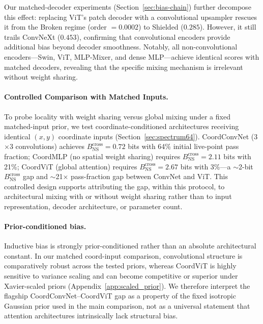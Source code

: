 \documentclass{article}
\begin{document}
Our matched-decoder experiments (Section~\ref{sec:bias-chain}) further decompose this effect: replacing ViT's patch decoder with a convolutional upsampler rescues it from the Broken regime (order $= 0.0002$) to Shielded ($0.285$). However, it still trails ConvNeXt ($0.453$), confirming that convolutional encoders provide additional bias beyond decoder smoothness. Notably, all non-convolutional encoders---Swin, ViT, MLP-Mixer, and dense MLP---achieve identical scores with matched decoders, revealing that the specific mixing mechanism is irrelevant without weight sharing.

\paragraph{Controlled Comparison with Matched Inputs.} To probe locality with weight sharing versus global mixing under a fixed matched-input prior, we test coordinate-conditioned architectures receiving identical $(x,y)$ coordinate inputs (Section~\ref{sec:spectrum64}). CoordConvNet (3$\times$3 convolutions) achieves $B_{\text{NS}}^{\text{cross}}=0.72$ bits with 64\% initial live-point pass fraction; CoordMLP (no spatial weight sharing) requires $B_{\text{NS}}^{\text{cross}}=2.11$ bits with 21\%; CoordViT (global attention) requires $B_{\text{NS}}^{\text{cross}}=2.67$ bits with 3\%---a $\sim$2-bit $B_{\text{NS}}^{\text{cross}}$ gap and $\sim$21$\times$ pass-fraction gap between ConvNet and ViT. This controlled design supports attributing the gap, within this protocol, to architectural mixing with or without weight sharing rather than to input representation, decoder architecture, or parameter count.

\paragraph{Prior-conditioned bias.} Inductive bias is strongly prior-conditioned rather than an absolute architectural constant. In our matched coord-input comparison, convolutional structure is comparatively robust across the tested priors, whereas CoordViT is highly sensitive to variance scaling and can become competitive or superior under Xavier-scaled priors (Appendix~\ref{app:scaled_prior}). We therefore interpret the flagship CoordConvNet--CoordViT gap as a property of the fixed isotropic Gaussian prior used in the main comparison, not as a universal statement that attention architectures intrinsically lack structural bias.
\end{document}
